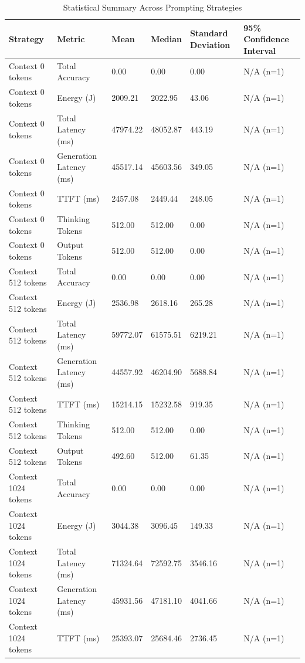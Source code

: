 \begin{table}
\caption{Statistical Summary Across Prompting Strategies}
\label{tab:statistical_summary}
\begin{tabular}{llllll}
\toprule
Strategy & Metric & Mean & Median & Standard Deviation & 95\% Confidence Interval \\
\midrule
Context 0 tokens & Total Accuracy & 0.00 & 0.00 & 0.00 & N/A (n=1) \\
Context 0 tokens & Energy (J) & 2009.21 & 2022.95 & 43.06 & N/A (n=1) \\
Context 0 tokens & Total Latency (ms) & 47974.22 & 48052.87 & 443.19 & N/A (n=1) \\
Context 0 tokens & Generation Latency (ms) & 45517.14 & 45603.56 & 349.05 & N/A (n=1) \\
Context 0 tokens & TTFT (ms) & 2457.08 & 2449.44 & 248.05 & N/A (n=1) \\
Context 0 tokens & Thinking Tokens & 512.00 & 512.00 & 0.00 & N/A (n=1) \\
Context 0 tokens & Output Tokens & 512.00 & 512.00 & 0.00 & N/A (n=1) \\
Context 512 tokens & Total Accuracy & 0.00 & 0.00 & 0.00 & N/A (n=1) \\
Context 512 tokens & Energy (J) & 2536.98 & 2618.16 & 265.28 & N/A (n=1) \\
Context 512 tokens & Total Latency (ms) & 59772.07 & 61575.51 & 6219.21 & N/A (n=1) \\
Context 512 tokens & Generation Latency (ms) & 44557.92 & 46204.90 & 5688.84 & N/A (n=1) \\
Context 512 tokens & TTFT (ms) & 15214.15 & 15232.58 & 919.35 & N/A (n=1) \\
Context 512 tokens & Thinking Tokens & 512.00 & 512.00 & 0.00 & N/A (n=1) \\
Context 512 tokens & Output Tokens & 492.60 & 512.00 & 61.35 & N/A (n=1) \\
Context 1024 tokens & Total Accuracy & 0.00 & 0.00 & 0.00 & N/A (n=1) \\
Context 1024 tokens & Energy (J) & 3044.38 & 3096.45 & 149.33 & N/A (n=1) \\
Context 1024 tokens & Total Latency (ms) & 71324.64 & 72592.75 & 3546.16 & N/A (n=1) \\
Context 1024 tokens & Generation Latency (ms) & 45931.56 & 47181.10 & 4041.66 & N/A (n=1) \\
Context 1024 tokens & TTFT (ms) & 25393.07 & 25684.46 & 2736.45 & N/A (n=1) \\

\end{tabular}
\end{table}
